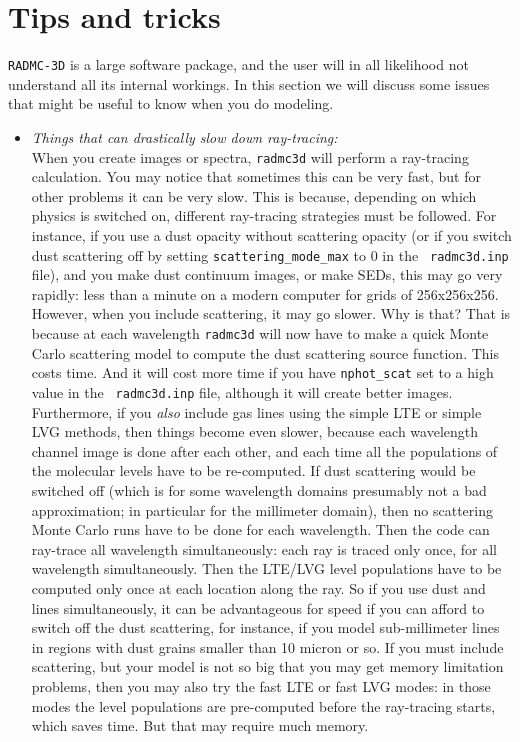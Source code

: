 \documentclass{report}
\begin{document}
\section{Tips and tricks}
%
{\small\tt RADMC-3D} is a large software package, and the user will in all
likelihood not understand all its internal workings. In this section we will
discuss some issues that might be useful to know when you do modeling.
\begin{itemize}
\item {\em Things that can drastically slow down ray-tracing:}\\
  When you create images or spectra, {\small\tt radmc3d} will perform a
  ray-tracing calculation. You may notice that sometimes this can be very
  fast, but for other problems it can be very slow. This is because,
  depending on which physics is switched on, different ray-tracing
  strategies must be followed. For instance, if you use a dust opacity
  without scattering opacity (or if you switch dust scattering off by
  setting {\small\tt scattering\_mode\_max} to 0 in the {\small\tt
    radmc3d.inp} file), and you make dust continuum images, or make SEDs, this
  may go very rapidly: less than a minute on a modern computer for grids of
  256x256x256. However, when you include scattering, it may go slower. Why
  is that? That is because at each wavelength {\small\tt radmc3d} will now
  have to make a quick Monte Carlo scattering model to compute the dust
  scattering source function. This costs time. And it will cost more time if
  you have {\small\tt nphot\_scat} set to a high value in the {\small\tt
    radmc3d.inp} file, although it will create better images. Furthermore, if
  you {\em also} include gas lines using the simple LTE or simple LVG
  methods, then things become even slower, because each wavelength channel
  image is done after each other, and each time all the populations of the
  molecular levels have to be re-computed. If dust scattering would be
  switched off (which is for some wavelength domains presumably not a bad
  approximation; in particular for the millimeter domain), then no
  scattering Monte Carlo runs have to be done for each wavelength. Then the
  code can ray-trace all wavelength simultaneously: each ray is traced only
  once, for all wavelength simultaneously. Then the LTE/LVG level
  populations have to be computed only once at each location along the ray.
  So if you use dust and lines simultaneously, it can be advantageous for
  speed if you can afford to switch off the dust scattering, for instance,
  if you model sub-millimeter lines in regions with dust grains smaller than
  10 micron or so. If you must include scattering, but your model is not so
  big that you may get memory limitation problems, then you may also try the
  fast LTE or fast LVG modes: in those modes the level populations are
  pre-computed before the ray-tracing starts, which saves time. But that may
  require much memory.
\end{itemize}
\end{document}
